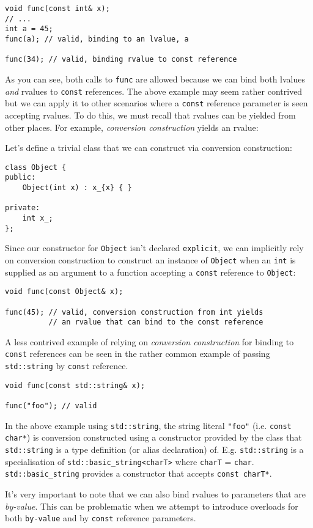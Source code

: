 		\begin{verbatim}
void func(const int& x);
// ...
int a = 45;
func(a); // valid, binding to an lvalue, a

func(34); // valid, binding rvalue to const reference
		\end{verbatim}

		As you can see, both calls to \texttt{func} are allowed because we can
		bind both lvalues \textit{and} rvalues to \texttt{const} references. The
		above example may seem rather contrived but we can apply it to other
		scenarios where a \texttt{const} reference parameter is seen accepting
		rvalues. To do this, we must recall that rvalues can be yielded from
		other places. For example, \textit{conversion construction} yields an
		rvalue: 

		Let's define a trivial class that we can construct via conversion
		construction:
		
		\begin{verbatim}
class Object {
public:
	Object(int x) : x_{x} { }

private:
	int x_;
};
		\end{verbatim}

		Since our constructor for \texttt{Object} isn't declared
		\texttt{explicit}, we can implicitly rely on conversion construction to
		construct an instance of \texttt{Object} when an \texttt{int} is
		supplied as an argument to a function accepting a \texttt{const}
		reference to \texttt{Object}:

		\begin{verbatim}
void func(const Object& x);

func(45); // valid, conversion construction from int yields
          // an rvalue that can bind to the const reference
		\end{verbatim}

		A less contrived example of relying on \textit{conversion construction}
		for binding to \texttt{const} references can be seen in the rather
		common example of passing \texttt{std::string} by \texttt{const}
		reference.

		
		\begin{verbatim}
void func(const std::string& x);

func("foo"); // valid 
		\end{verbatim}

		In the above example using \texttt{std::string}, the string literal
		\texttt{"foo"} (i.e. \texttt{const char*}) is conversion constructed
		using a constructor provided by the class that \texttt{std::string} is a
		type definition (or alias declaration) of. E.g. \texttt{std::string} is
		a specialisation of \texttt{std::basic\_string<charT>} where
		\texttt{charT} = \texttt{char}. \texttt{std::basic\_string} provides a
		constructor that accepts \texttt{const charT*}.

		It's very important to note that we can also bind rvalues to parameters
		that are \textit{by-value}. This can be problematic when we attempt to
		introduce overloads for both \texttt{by-value} and by \texttt{const}
		reference parameters.
